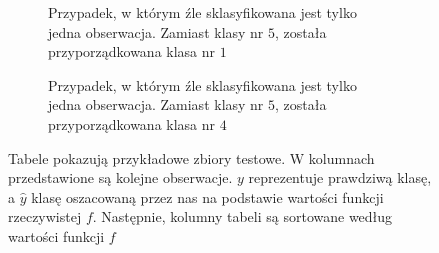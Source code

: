 \documentclass{mini}
\begin{document}
\begin{figure}[!h]
\begin{subfigure}{\textwidth}
\begin{center}
\end{center}
\caption{Przypadek, w którym źle sklasyfikowana jest tylko jedna obserwacja. Zamiast klasy nr $5$, została przyporządkowana klasa nr $1$\\  }
\label{vus01}
\end{subfigure}
\hspace{1cm}
\begin{subfigure}{\textwidth}
\begin{center}
\end{center}
\caption{Przypadek, w którym źle sklasyfikowana jest tylko jedna obserwacja. Zamiast klasy nr $5$, została przyporządkowana klasa nr $4$}
\label{vus02}
\end{subfigure}
\caption{Tabele pokazują przykładowe zbiory testowe. W kolumnach przedstawione są kolejne obserwacje. $y$ reprezentuje prawdziwą klasę, a $\hat{y}$ klasę oszacowaną przez nas na podstawie wartości funkcji rzeczywistej $f$. Następnie, kolumny tabeli są sortowane według wartości funkcji $f$}
\label{vusprzyklad}
\end{figure}
\end{document}
